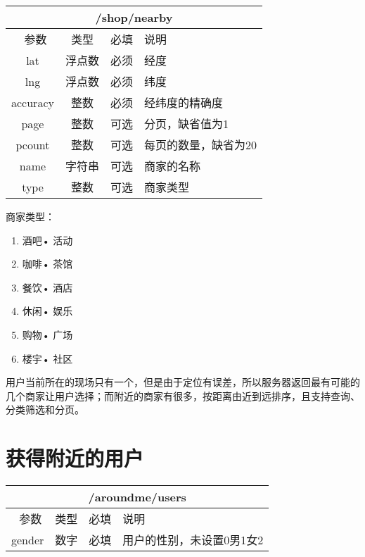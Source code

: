 \documentclass[cs4size]{ctexartutf8}
\begin{document}
\begin{table}[H]
   \begin{center}
\begin{tabular}{|c|c|c|p{12cm}|}
\hline
\multicolumn{4}{|c|}{/shop/nearby} \\
\hline\hline
 \  参数  & 类型 & 必填 &  说明  \\
\hline
 lat  & 浮点数 & 必须 & 经度\\
\hline
 lng  &  浮点数 & 必须 & 纬度\\ 
\hline
 accuracy  & 整数 & 必须 & 经纬度的精确度\\ 
 \hline
 page  & 整数 & 可选 & 分页，缺省值为1\\ 
 \hline
 pcount  & 整数 & 可选 & 每页的数量，缺省为20\\ 
  \hline
 name  & 字符串 & 可选 & 商家的名称\\ 
  \hline
 type  & 整数 & 可选 & 商家类型\\  
\hline
\end{tabular}
   \end{center}
\end{table}

商家类型：
\begin{enumerate}
\item 酒吧• 活动
\item 咖啡• 茶馆   
\item 餐饮• 酒店
\item 休闲• 娱乐
\item 购物• 广场
\item 楼宇• 社区
\end{enumerate}


用户当前所在的现场只有一个，但是由于定位有误差，所以服务器返回最有可能的几个商家让用户选择；而附近的商家有很多，按距离由近到远排序，且支持查询、分类筛选和分页。



\section{获得附近的用户}

\begin{table}[H]
   \begin{center}
\begin{tabular}{|c|c|c|p{12cm}|}
\hline
\multicolumn{4}{|c|}{/aroundme/users} \\
\hline\hline
 \  参数  & 类型 & 必填 &  说明  \\
 \hline
 gender  & 数字 & 必填 &  用户的性别，未设置0男1女2\\
\hline
\end{tabular}
   \end{center}
\end{table}
\end{document}
